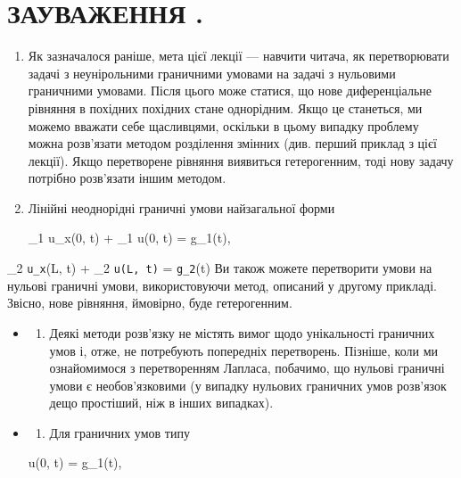 \documentclass[
  ukrainian,
]{article}
\providecommand{\tightlist}{%
  \setlength{\itemsep}{0pt}\setlength{\parskip}{0pt}}
\begin{document}
\section{ЗАУВАЖЕННЯ
.}\label{ux437ux430ux443ux432ux430ux436ux435ux43dux43dux44f-.}

\begin{enumerate}
\def\labelenumi{\arabic{enumi}.}
\item
  Як зазначалося раніше, мета цієї лекції --- навчити читача, як
  перетворювати задачі з неунірольними граничними умовами на задачі з
  нульовими граничними умовами. Після цього може статися, що нове
  диференціальне рівняння в похідних похідних стане однорідним. Якщо це
  станеться, ми можемо вважати себе щасливцями, оскільки в цьому випадку
  проблему можна розв'язати методом розділення змінних (див. перший
  приклад з цієї лекції). Якщо перетворене рівняння виявиться
  гетерогенним, тоді нову задачу потрібно розв'язати іншим методом.
\item
  Лінійні неоднорідні граничні умови найзагальної форми

  \alpha\_1 u\_x(0, t) + \beta\_1 u(0, t) = g\_1(t),
\end{enumerate}

\alpha\_2 \texttt{u\_x}(L, t) + \beta\_2 \texttt{u(L,\ t)} =
\texttt{g\_2}(t) Ви також можете перетворити умови на нульові граничні
умови, використовуючи метод, описаний у другому прикладі. Звісно, нове
рівняння, ймовірно, буде гетерогенним.

\begin{itemize}
\item
  \begin{enumerate}
  \def\labelenumi{\arabic{enumi}.}
  \setcounter{enumi}{2}
  \tightlist
  \item
    Деякі методи розв'язку не містять вимог щодо унікальності граничних
    умов і, отже, не потребують попередніх перетворень. Пізніше, коли ми
    ознайомимося з перетворенням Лапласа, побачимо, що нульові граничні
    умови є необов'язковими (у випадку нульових граничних умов розв'язок
    дещо простіший, ніж в інших випадках).
  \end{enumerate}
\item
  \begin{enumerate}
  \def\labelenumi{\arabic{enumi}.}
  \setcounter{enumi}{3}
  \tightlist
  \item
    Для граничних умов типу
  \end{enumerate}

  u(0, t) = g\_1(t),
\end{itemize}
\end{document}
